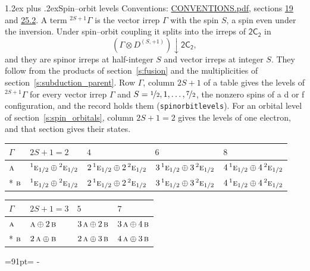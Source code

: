 \documentclass[10pt,a4paper]{article}
\makeatletter
\renewcommand\section{\@startsection{section}{1}{\z@}{-3ex plus -1ex minus -.2ex}%
  {1.2ex plus .2ex}{\normalfont\large\sffamily\bfseries\color{parttitle}}}
\newcommand{\needspace}[1]{\par\penalty-100\begingroup\dimen0=#1\relax\dimen2=\pagegoal
  \advance\dimen2-\pagetotal\ifdim\dimen0>\dimen2\relax\ifdim\dimen2>0pt\vfil\break\fi\fi
  \endgroup}
\numberwithin{equation}{section}
\newcommand{\grp}[1]{\mathsf{#1}}
\newcommand{\irr}[1]{\text{\normalfont\scshape #1}}
\newcommand{\conjpair}[1]{{}^{#1}}
\newcommand{\restr}[2]{#1\!\downarrow#2}
\newcommand{\irrJp}[2]{D^{(#1,#2)}}
\newcommand{\irrprod}{\otimes}
\newcommand{\term}[2]{{}^{#1}#2}
\makeatother
\begin{document}
\section{Spin--orbit levels}\label{s:spin_orbit}
Conventions: \href{../../CONVENTIONS.pdf}{CONVENTIONS.pdf}, sections \href{../../../rotation/CONVENTIONS.pdf\#conv.19}{19} and \href{../../CONVENTIONS.pdf\#conv.25.2}{25.2}.
\leavevmode\label{n:local.spin}\label{n:symbol.term}A term $\term{2S+1}{\Gamma}$ is the vector irrep $\Gamma$ with the spin $S$, a spin even under the inversion. Under spin--orbit coupling it splits into the irreps of $\grp{2C_{2}}$ in
\begin{equation}\label{e:spinorbit}\restr{(\Gamma \irrprod \irrJp{S}{+1})}{\grp{2C_{2}}},\end{equation}
and they are spinor irreps at half-integer $S$ and vector irreps at integer $S$. They follow from the products of section~\ref{s:fusion} and the multiplicities of section~\ref{s:subduction_parent}. Row $\Gamma$, column $2S + 1$ of a table gives the levels of $\term{2S+1}{\Gamma}$ for every vector irrep $\Gamma$ and $S = \nicefrac{1}{2}, 1, \dots, \nicefrac{7}{2}$, the nonzero spins of a d or f configuration, and the record holds them (\texttt{spinorbitlevels}). For an orbital level of section~\ref{s:spin_orbitals}, column $2S + 1 = 2$ gives the levels of one electron, and that section gives their states.
{\small\setlength{\tabcolsep}{3pt}\begin{longtable}{@{}lllll@{}}\toprule
$\Gamma$ & $2S + 1 = 2$ & $4$ & $6$ & $8$\\\midrule\endhead
\bottomrule\endfoot\endlastfoot
$\irr{a}$ & $\conjpair{1}\irr{e}_{1/2}\oplus \conjpair{2}\irr{e}_{1/2}$ & $2\,\conjpair{1}\irr{e}_{1/2}\oplus 2\,\conjpair{2}\irr{e}_{1/2}$ & $3\,\conjpair{1}\irr{e}_{1/2}\oplus 3\,\conjpair{2}\irr{e}_{1/2}$ & $4\,\conjpair{1}\irr{e}_{1/2}\oplus 4\,\conjpair{2}\irr{e}_{1/2}$\\*
$\irr{b}$ & $\conjpair{1}\irr{e}_{1/2}\oplus \conjpair{2}\irr{e}_{1/2}$ & $2\,\conjpair{1}\irr{e}_{1/2}\oplus 2\,\conjpair{2}\irr{e}_{1/2}$ & $3\,\conjpair{1}\irr{e}_{1/2}\oplus 3\,\conjpair{2}\irr{e}_{1/2}$ & $4\,\conjpair{1}\irr{e}_{1/2}\oplus 4\,\conjpair{2}\irr{e}_{1/2}$\\
\bottomrule\end{longtable}}
{\small\setlength{\tabcolsep}{3pt}\begin{longtable}{@{}llll@{}}\toprule
$\Gamma$ & $2S + 1 = 3$ & $5$ & $7$\\\midrule\endhead
\bottomrule\endfoot\endlastfoot
$\irr{a}$ & $\irr{a}\oplus 2\,\irr{b}$ & $3\,\irr{a}\oplus 2\,\irr{b}$ & $3\,\irr{a}\oplus 4\,\irr{b}$\\*
$\irr{b}$ & $2\,\irr{a}\oplus \irr{b}$ & $2\,\irr{a}\oplus 3\,\irr{b}$ & $4\,\irr{a}\oplus 3\,\irr{b}$\\
\bottomrule\end{longtable}}
\needspace{91pt}
\end{document}
